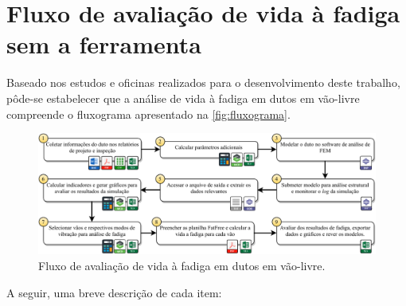 \section{Fluxo de avaliação de vida à fadiga sem a ferramenta}\label{sec:workflow}


Baseado nos estudos e oficinas realizados para o desenvolvimento deste trabalho, pôde-se estabelecer que a análise de vida à fadiga em dutos em vão-livre compreende o fluxograma apresentado na \autoref{fig:fluxograma}. %

\begin{figure}[!ht]
    \centering
    \caption{Fluxo de avaliação de vida à fadiga em dutos em vão-livre.}\label{fig:fluxograma}
    \includegraphics[width=\textwidth]{imagens/fluxograma.pdf}
\end{figure}

A seguir, uma breve descrição de cada item:


